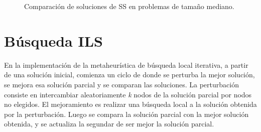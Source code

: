 \documentclass{ci5652}
\begin{document}
\begin{figure}[p]
	\setlength\fboxsep{0pt}
	\setlength\fboxrule{0.5pt}
	\caption{Comparación de soluciones de SS en problemas de tamaño mediano.}
	\label{fig:ss_s_m}
	\label{fig:ss_s_m}
\end{figure}

\section{Búsqueda ILS}
En la implementación de la metaheurística de búsqueda local iterativa, a partir de una solución inicial, comienza un ciclo de donde se perturba la mejor solución, se mejora esa solución parcial y se comparan las soluciones. La perturbación consiste en intercambiar aleatoriamente \textit{k} nodos de la solución parcial por nodos no elegidos. El mejoramiento es realizar una búsqueda local a la solución obtenida por la perturbación. Luego se compara la solución parcial con la mejor solución obtenida, y se actualiza la segundar de ser mejor la solución parcial.
\end{document}
